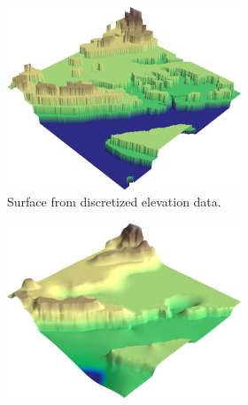 \documentclass[a4paper,10pt]{report}
\begin{document}
\begin{figure}[H]
    \centering
    \begin{subfigure}{\textwidth}
        \begin{subfigure}{.49\textwidth}
        \centering
            \includegraphics[width=\textwidth]{../images/NH52/2D_Data_Interpolation_3D_discretized_datagrid.png}
        \renewcommand\thesubfigure{\alph{subfigure}) i}
        \caption{Surface from discretized elevation data.}
        \end{subfigure}
        \hfill
        \begin{subfigure}{.49\textwidth}
            \includegraphics[width=\textwidth]{../images/NH52/2D_Data_Interpolation_3D_discretized_datagrid_interpolated.png}

\end{subfigure}
\end{subfigure}
\end{figure}
\end{document}
